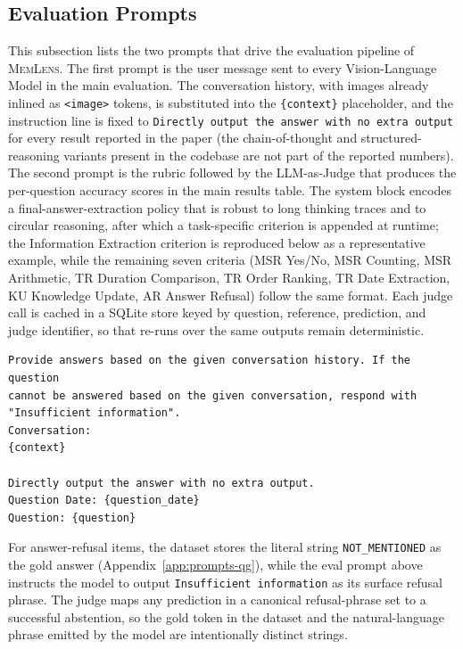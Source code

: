 \documentclass{llmxive}
\providecommand{\bench}{\textsc{MemLens}}
\begin{document}
\subsection{Evaluation Prompts}
\label{app:prompts-eval}

This subsection lists the two prompts that drive the evaluation pipeline of \bench. The first prompt is the user message sent to every Vision-Language Model in the main evaluation. The conversation history, with images already inlined as \texttt{<image>} tokens, is substituted into the \texttt{\{context\}} placeholder, and the instruction line is fixed to \texttt{Directly output the answer with no extra output} for every result reported in the paper (the chain-of-thought and structured-reasoning variants present in the codebase are not part of the reported numbers). The second prompt is the rubric followed by the LLM-as-Judge that produces the per-question accuracy scores in the main results table. The system block encodes a final-answer-extraction policy that is robust to long thinking traces and to circular reasoning, after which a task-specific criterion is appended at runtime; the Information Extraction criterion is reproduced below as a representative example, while the remaining seven criteria (MSR Yes/No, MSR Counting, MSR Arithmetic, TR Duration Comparison, TR Order Ranking, TR Date Extraction, KU Knowledge Update, AR Answer Refusal) follow the same format. Each judge call is cached in a SQLite store keyed by question, reference, prediction, and judge identifier, so that re-runs over the same outputs remain deterministic.

\begin{promptbox}[colback=black!5, colframe=white!40!black, title=LVLM Evaluator User Prompt]{}
\scriptsize
\begin{verbatim}
Provide answers based on the given conversation history. If the question
cannot be answered based on the given conversation, respond with
"Insufficient information".
Conversation:
{context}

Directly output the answer with no extra output.
Question Date: {question_date}
Question: {question}
\end{verbatim}
\end{promptbox}

For answer-refusal items, the dataset stores the literal string \texttt{NOT\_MENTIONED} as the gold answer (Appendix~\ref{app:prompts-qg}), while the eval prompt above instructs the model to output \texttt{Insufficient information} as its surface refusal phrase. The judge maps any prediction in a canonical refusal-phrase set to a successful abstention, so the gold token in the dataset and the natural-language phrase emitted by the model are intentionally distinct strings.
\end{document}
